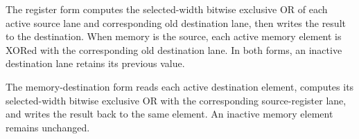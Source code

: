 The register form computes the selected-width bitwise exclusive OR of each
active source lane and corresponding old destination lane, then writes the
result to the destination. When memory is the source, each active memory
element is XORed with the corresponding old destination lane. In both forms, an
inactive destination lane retains its previous value.

The memory-destination form reads each active destination element, computes its
selected-width bitwise exclusive OR with the corresponding source-register lane,
and writes the result back to the same element. An inactive memory element
remains unchanged.
